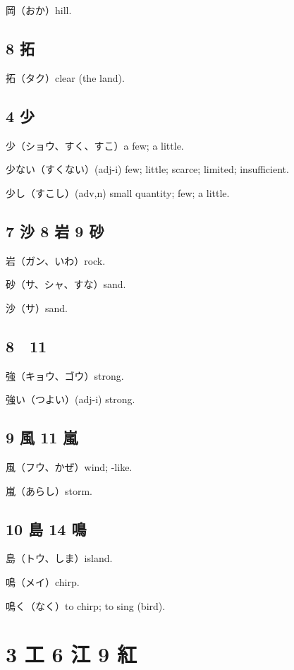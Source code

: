 岡（おか）hill.

\subsection{8 拓}

拓（タク）clear (the land).

\subsection{4 少}

少（ショウ、すく、すこ）a few; a little.

少ない（すくない）(adj-i) few; little; scarce; limited; insufficient.

少し（すこし）(adv,n) small quantity; few; a little.

\subsection{7 沙 8 岩 9 砂}

岩（ガン、いわ）rock.

砂（サ、シャ、すな）sand.

沙（サ）sand.

\subsection{8 𧈧 11 強}

強（キョウ、ゴウ）strong.

強い（つよい）(adj-i) strong.

\subsection{9 風 11 嵐}

風（フウ、かぜ）wind; -like.

嵐（あらし）storm.

\subsection{10 島 14 鳴}

島（トウ、しま）island.

鳴（メイ）chirp.

鳴く（なく）to chirp; to sing (bird).

\section{3 工 6 江 9 紅}

